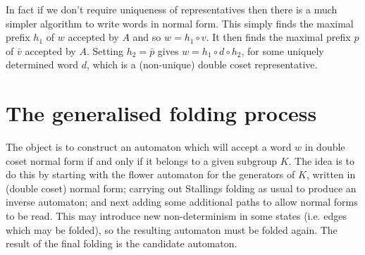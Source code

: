 \documentclass[a4paper,12pt]{article}
\newtheorem{exam}[theorem]{Example}
\newenvironment{example}{\begin{exam} \rm}{\end{exam}}
\numberwithin{equation}{section}
\numberwithin{figure}{section}
\begin{document}
In fact if we don't require uniqueness of representatives then there is
a much simpler algorithm to write words in normal form.
This
simply finds the maximal prefix $h_1$ of $w$  accepted  by $A$  and so $w=h_1\circ v$. It then finds the
maximal prefix $p$ of $\bar v$ accepted by $A$. Setting $h_2=\bar p$ gives $w=h_1\circ d \circ h_2$, for
some uniquely determined word $d$, which is a (non-unique)
double coset representative.



%
%
\section{The generalised folding process}\label{sec:foldings}
The object is to construct an automaton which will accept a word
$w$ in double coset normal form if and only if it belongs to a
given subgroup $K$. The idea is to do this by starting with the
flower automaton for the generators of $K$, written in (double
coset) normal form; carrying out Stallings folding as usual to
produce an inverse automaton; and next
adding some additional paths to allow normal forms to be read.
This may introduce new non-determinism in some  states (i.e. edges
which may be folded), so the resulting automaton must be folded
again. The result of the final folding is the candidate automaton.
\end{document}
